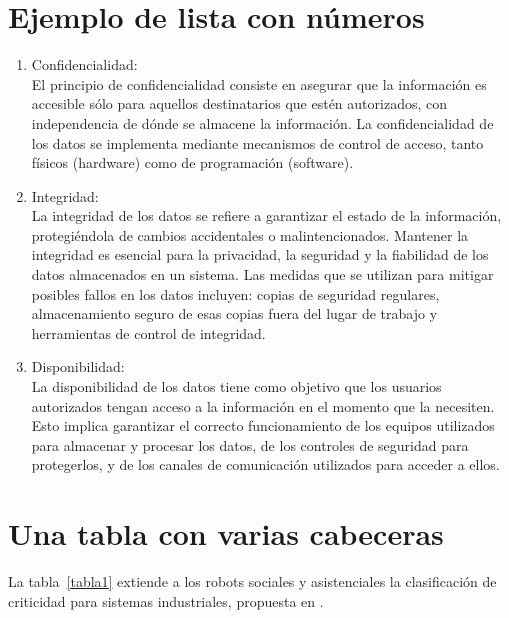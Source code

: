 \documentclass[12pt,a4paper,onecolumn,oneside]{report}
\begin{document}
\section*{Ejemplo de lista con números}

\begin{enumerate}

\item Confidencialidad:\\
El principio de confidencialidad consiste en asegurar que la información es accesible sólo para aquellos destinatarios que estén autorizados, con independencia de dónde se almacene la información.
La confidencialidad de los datos se implementa mediante mecanismos de control de acceso, tanto físicos (hardware) como  de programación (software).

\item Integridad:\\
La integridad de los datos se refiere a garantizar el estado de la información, protegiéndola de cambios accidentales o malintencionados. Mantener la integridad es esencial para la privacidad, la seguridad y la fiabilidad de los datos almacenados en un sistema.
Las medidas que se utilizan para mitigar posibles fallos en los datos incluyen: copias de seguridad regulares, almacenamiento seguro de esas copias fuera del lugar de trabajo y herramientas de control de integridad.

\item Disponibilidad:\\
La disponibilidad de los datos tiene como objetivo que los usuarios autorizados tengan acceso a la información en el momento que la necesiten. Esto implica garantizar el correcto funcionamiento de los equipos utilizados para almacenar y procesar los datos, de los controles de seguridad para protegerlos, y de los canales de comunicación utilizados para acceder a ellos.

\end{enumerate}


\section*{Una tabla con varias cabeceras}
\label{Ciberseguridad robótica}

La tabla~\ref{tabla1} extiende a los robots sociales y asistenciales la clasificación de criticidad para sistemas industriales, propuesta en \cite{CSSP}.
\end{document}
